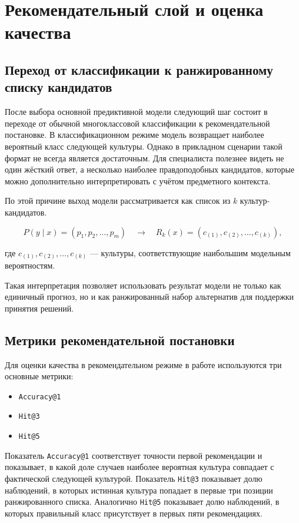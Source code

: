 \section{Рекомендательный слой и оценка качества}

\subsection{Переход от классификации к ранжированному списку кандидатов}

После выбора основной предиктивной модели следующий шаг состоит в переходе от обычной многоклассовой классификации к рекомендательной постановке. В классификационном режиме модель возвращает наиболее вероятный класс следующей культуры. Однако в прикладном сценарии такой формат не всегда является достаточным. Для специалиста полезнее видеть не один жёсткий ответ, а несколько наиболее правдоподобных кандидатов, которые можно дополнительно интерпретировать с учётом предметного контекста.

По этой причине выход модели рассматривается как список из \(k\) культур-кандидатов.

\[
P(y \mid x) = (p_1, p_2, \ldots, p_m)
\quad \rightarrow \quad
R_k(x) = (c_{(1)}, c_{(2)}, \ldots, c_{(k)}),
\]

где \(c_{(1)}, c_{(2)}, \ldots, c_{(k)}\) --- культуры, соответствующие наибольшим модельным вероятностям.

Такая интерпретация позволяет использовать результат модели не только как единичный прогноз, но и как ранжированный
набор альтернатив для поддержки принятия решений.

\subsection{Метрики рекомендательной постановки}

Для оценки качества в рекомендательном режиме в работе используются три основные метрики:

\begin{itemize}
\tightlist
\item
  \texttt{Accuracy@1}
\item
  \texttt{Hit@3}
\item
  \texttt{Hit@5}
\end{itemize}

Показатель \texttt{Accuracy@1} соответствует точности первой рекомендации и показывает, в какой доле случаев наиболее вероятная культура совпадает с фактической следующей культурой. Показатель \texttt{Hit@3} показывает долю наблюдений, в которых истинная культура попадает в первые три позиции ранжированного списка. Аналогично \texttt{Hit@5} показывает долю наблюдений, в которых правильный класс присутствует в первых пяти рекомендациях.

